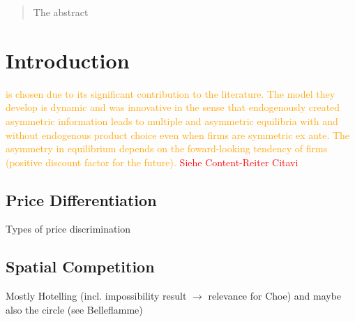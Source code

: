 \documentclass[a4paper, 11 pt, fleqn]{article}
\begin{document}
\newpage
{}
\tableofcontents
\listoffigures
\newpage


\newpage


\begin{abstract}
	The abstract
\end{abstract}
%
\section{Introduction} \label{sec:intro}
%
\textcolor{orange}{
\citet{Choe.2018} is chosen due to its significant contribution to the literature. The model they develop is dynamic and
was innovative in the sense that endogenously created asymmetric information leads to multiple and asymmetric equilibria with
and without endogenous product choice even when firms are symmetric ex ante. The asymmetry in equilibrium depends on the foward-looking
tendency of firms (positive discount factor for the future).}
\textcolor{red}{Siehe Content-Reiter Citavi}

\subsection{Price Differentiation} \label{ssec:price-diff}
Types of price discrimination
%
\subsection{Spatial Competition}
Mostly Hotelling (incl. impossibility result $\to$ relevance for Choe) and maybe also the circle (see Belleflamme)
%
\end{document}
